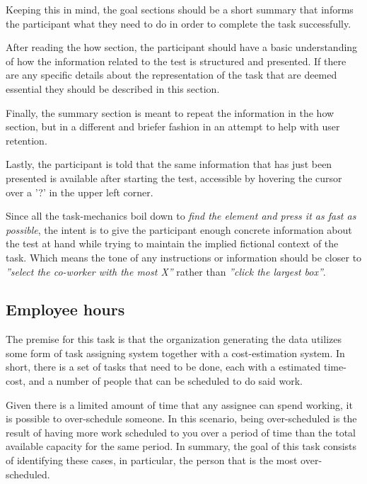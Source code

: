 {  Keeping this in mind, the goal sections should be a short summary that
  informs the participant what they need to do in order to complete the task
  successfully.

  After reading the how section, the participant should have a
  basic understanding of how the information related to the test is
  structured and presented. If there are any specific details about the
  representation of the task that are deemed essential they should be
  described in this section.

  Finally, the summary section is meant to repeat the information in the how
  section, but in a different and briefer fashion in an attempt to help with
  user retention.

  Lastly, the participant is told that the same information that has just
  been presented is available after starting the test, accessible by
  hovering the cursor over a '?' in the upper left corner.

  Since all the task-mechanics boil down to
  \textit{find the element and press it as fast as possible},
  the intent is to give the participant enough concrete
  information about the test at hand while trying to maintain the
  implied fictional context of the task. Which means the tone of any
  instructions or information should be closer to
  \textit{''select the co-worker with the most X''} rather than
  \textit{''click the largest box''}.

  \subsection{Employee hours}

    \textit{\ideaOne}

    The premise for this task is that the organization generating the data
    utilizes some form of task assigning system together with a
    cost-estimation system. In short, there is a set of tasks that need to
    be done, each with a estimated time-cost, and a number of people that
    can be scheduled to do said work.

    Given there is a limited amount of time that any assignee can spend
    working, it is possible to over-schedule someone. In this scenario,
    being over-scheduled is the result of having more work scheduled to you
    over a period of time than the total available capacity for the same
    period. In summary, the goal of this task consists of identifying these
    cases, in particular, the person that is the most over-scheduled.

}
